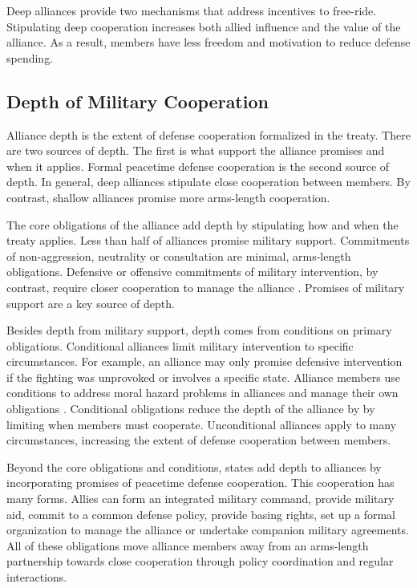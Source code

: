 \documentclass[12pt]{article}
\begin{document}
Deep alliances provide two mechanisms that address incentives to free-ride. 
Stipulating deep cooperation increases both allied influence and the value of the alliance. 
As a result, members have less freedom and motivation to reduce defense spending. 



\subsection{Depth of Military Cooperation} 


Alliance depth is the extent of defense cooperation formalized in the treaty. 
There are two sources of depth. 
The first is what support the alliance promises and when it applies. 
Formal peacetime defense cooperation is the second source of depth. 
In general, deep alliances stipulate close cooperation between members.
By contrast, shallow alliances promise more arms-length cooperation. 


The core obligations of the alliance add depth by stipulating how and when the treaty applies. 
Less than half of alliances promise military support. 
Commitments of non-aggression, neutrality or consultation are minimal, arms-length obligations. 
Defensive or offensive commitments of military intervention, by contrast, require closer cooperation to manage the alliance \citep{Snyder1997}. 
Promises of military support are a key source of depth. 


Besides depth from military support, depth comes from conditions on primary obligations. 
Conditional alliances limit military intervention to specific circumstances. 
For example, an alliance may only promise defensive intervention if the fighting was unprovoked or involves a specific state.  
Alliance members use conditions to address moral hazard problems in alliances \citep{Benson2012, Bensonetal2014} and manage their own obligations \citep{Chibaetal2015}. 
Conditional obligations reduce the depth of the alliance by by limiting when members must cooperate. 
Unconditional alliances apply to many circumstances, increasing the extent of defense cooperation between members.


Beyond the core obligations and conditions, states add depth to alliances by incorporating promises of peacetime defense cooperation. 
This cooperation has many forms. 
Allies can form an integrated military command, provide military aid, commit to a common defense policy, provide basing rights, set up a formal organization to manage the alliance or undertake companion military agreements. 
All of these obligations move alliance members away from an arms-length partnership towards close cooperation through policy coordination and regular interactions. 
\end{document}
